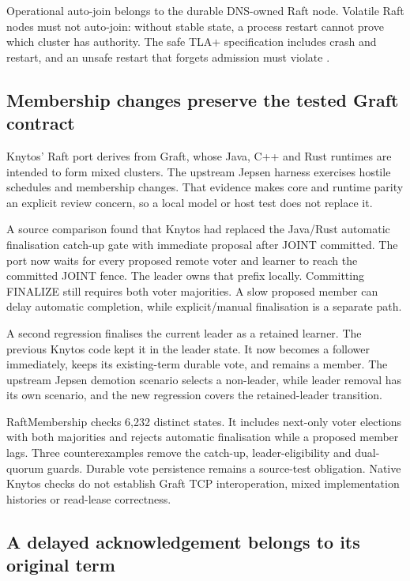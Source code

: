 Operational auto-join belongs to the durable DNS-owned Raft node. Volatile
Raft nodes must not auto-join: without stable state, a process restart cannot
prove which cluster has authority. The safe
TLA+ specification includes crash and restart, and an unsafe restart that forgets
admission must violate .

\subsection{Membership changes preserve the tested Graft contract}

Knytos' Raft port derives from Graft, whose Java, C++ and Rust runtimes are
intended to form mixed clusters. The upstream Jepsen harness exercises hostile
schedules and membership changes. That evidence makes core and runtime parity
an explicit review concern, so a local model or host test does not replace it.

A source comparison found that Knytos had replaced the Java/Rust automatic
finalisation catch-up gate with immediate proposal after JOINT committed. The
port now waits for every proposed remote voter and learner to reach the committed
JOINT fence. The leader owns that prefix locally. Committing FINALIZE still
requires both voter majorities. A slow proposed member can delay automatic
completion, while explicit/manual finalisation is a separate path.

A second regression finalises the current leader as a retained learner. The
previous Knytos code kept it in the leader state. It now becomes a follower
immediately, keeps its existing-term durable vote, and remains a member. The
upstream Jepsen demotion scenario selects a non-leader, while leader removal has
its own scenario, and the new regression covers the retained-leader transition.

RaftMembership checks 6,232 distinct states. It includes
next-only voter elections with both majorities and rejects automatic finalisation
while a proposed member lags. Three counterexamples remove the catch-up,
leader-eligibility and dual-quorum guards. Durable vote persistence remains a
source-test obligation. Native Knytos checks do not establish Graft TCP
interoperation, mixed implementation histories or read-lease correctness.

\subsection{A delayed acknowledgement belongs to its original term}

